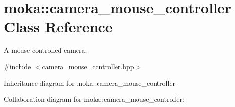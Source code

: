 \hypertarget{classmoka_1_1camera__mouse__controller}{}\section{moka\+::camera\+\_\+mouse\+\_\+controller Class Reference}
\label{classmoka_1_1camera__mouse__controller}


A mouse-\/controlled camera.  




{\ttfamily \#include $<$camera\+\_\+mouse\+\_\+controller.\+hpp$>$}



Inheritance diagram for moka\+::camera\+\_\+mouse\+\_\+controller\+:


Collaboration diagram for moka\+::camera\+\_\+mouse\+\_\+controller\+:
